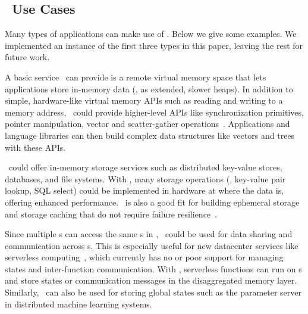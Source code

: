 \documentclass[10pt,times,twocolumn]{article}
\begin{document}
\begin{appendices}

\section{\phdm\ Use Cases}
Many types of applications can make use of \phdm.
Below we give some examples. %
We implemented an instance of the first three types in this paper,
leaving the rest for future work.

A basic service \phdm\ can provide is a remote virtual memory space that lets applications
store in-memory data (\eg, as extended, slower heaps).
In addition to simple, hardware-like virtual memory APIs such as reading and writing to a memory address, 
\phdm\ could provide higher-level APIs like synchronization primitives, pointer manipulation, 
vector and scatter-gather operations~\cite{Aguilera-FarMemory}.
Applications and language libraries can then build complex data structures like vectors 
and trees with these APIs.

\phdm\ could offer in-memory storage services such as distributed key-value stores, databases, and file systems.
With \phdm, many storage operations (\eg, key-value pair lookup, SQL select) 
could be implemented in hardware at where the data is, offering enhanced performance. 
\phdm\ is also a good fit for building ephemeral storage and storage caching that do not require failure resilience~\cite{SnowFlake-NSDI20,Pocket,fitzpatrick2004distributed}.

Since multiple \CN{}s can access the same \MN{}s in \phdm,
\phdm\ could be used for data sharing and communication across \CN{}s.
This is especially useful for new datacenter services like serverless computing~\cite{Berkeley-Serverless},
which currently has no or poor support for managing states and inter-function communication.
With \phdm, serverless functions can run on \CN{}s and store states or communication messages in the disaggregated memory layer.
Similarly, \phdm\ can also be used for storing global states such as the parameter server in distributed machine learning systems.


\end{appendices}
\end{document}
